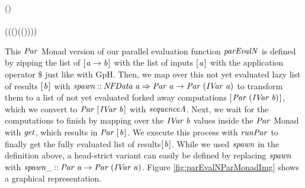 \documentclass[paper=A4,twoside=true,openright,parskip=full,chapterprefix=true,headings=normal,bibliography=totoc,listof=totoc,titlepage=on,captions=tableabove,draft=false,british]{scrreprt}%
\begin{document}
\begin{hscode}\SaveRestoreHook
{}%
%
%
\>[B]{}\mathbin{::}(\;)\<[E]%
\\
\>[B]{}\;\;\mathrel{=}\mathbin{\$}{}\<[E]%
\\
\>[B]{}\<[5]%
\>[5]{}(\;(\;(\mathbin{\circ})\;(\;(\mathbin{\$})\;\;)))\bind {}\;\<[E]%
\ColumnHook
\end{hscode}\resethooks
\vspace{-2\baselineskip}

This \ensuremath{\Conid{Par}} Monad version of our parallel evaluation function \ensuremath{\Varid{parEvalN}}
is defined by zipping the list of \ensuremath{[\mskip1.5mu \Varid{a}\to \Varid{b}\mskip1.5mu]} with the list of inputs
\ensuremath{[\mskip1.5mu \Varid{a}\mskip1.5mu]} with the application operator \ensuremath{\mathbin{\$}} just like with GpH. Then, we map
over this not yet evaluated lazy list of results \ensuremath{[\mskip1.5mu \Varid{b}\mskip1.5mu]} with
\ensuremath{\Varid{spawn}\mathbin{::}\Conid{NFData}\;\Varid{a}\Rightarrow \Conid{Par}\;\Varid{a}\to \Conid{Par}\;(\Conid{IVar}\;\Varid{a})} to transform them to a list
of not yet evaluated forked away computations \ensuremath{[\mskip1.5mu \Conid{Par}\;(\Conid{IVar}\;\Varid{b})\mskip1.5mu]}, which we
convert to \ensuremath{\Conid{Par}\;[\mskip1.5mu \Conid{IVar}\;\Varid{b}\mskip1.5mu]} with \ensuremath{\Varid{sequenceA}}. Next, we wait for the
computations to finish by mapping over the \ensuremath{\Conid{IVar}\;\Varid{b}} values inside the
\ensuremath{\Conid{Par}} Monad with \ensuremath{\Varid{get}}, which results in \ensuremath{\Conid{Par}\;[\mskip1.5mu \Varid{b}\mskip1.5mu]}. We execute this
process with \ensuremath{\Varid{runPar}} to finally get the fully evaluated list of
results\ensuremath{[\mskip1.5mu \Varid{b}\mskip1.5mu]}. While we used \ensuremath{\Varid{spawn}} in the definition above, a
head-strict variant can easily be defined by replacing \ensuremath{\Varid{spawn}} with
\ensuremath{\Varid{spawn\char95 }\mathbin{::}\Conid{Par}\;\Varid{a}\to \Conid{Par}\;(\Conid{IVar}\;\Varid{a})}. Figure \ref{fig:parEvalNParMonadImg}
shows a graphical representation.
\end{document}
